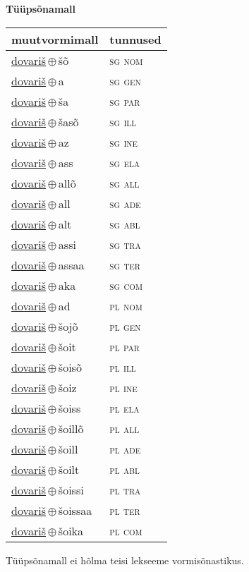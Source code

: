

\vspace{3.5em}
\noindent \begin{minipage}{\textwidth}
\noindent \textbf{Tüüpsõnamall \,}\\

\begin{sideways}
\begin{tabular}{l l}
muutvormimall & tunnused \\
\hline
\underline{dovariš}\,$\oplus$\,šõ & \textsc{ sg nom } \\
\underline{dovariš}\,$\oplus$\,a & \textsc{ sg gen } \\
\underline{dovariš}\,$\oplus$\,ša & \textsc{ sg par } \\
\underline{dovariš}\,$\oplus$\,šasõ & \textsc{ sg ill } \\
\underline{dovariš}\,$\oplus$\,az & \textsc{ sg ine } \\
\underline{dovariš}\,$\oplus$\,ass & \textsc{ sg ela } \\
\underline{dovariš}\,$\oplus$\,allõ & \textsc{ sg all } \\
\underline{dovariš}\,$\oplus$\,all & \textsc{ sg ade } \\
\underline{dovariš}\,$\oplus$\,alt & \textsc{ sg abl } \\
\underline{dovariš}\,$\oplus$\,assi & \textsc{ sg tra } \\
\underline{dovariš}\,$\oplus$\,assaa & \textsc{ sg ter } \\
\underline{dovariš}\,$\oplus$\,aka & \textsc{ sg com } \\
\underline{dovariš}\,$\oplus$\,ad & \textsc{ pl nom } \\
\underline{dovariš}\,$\oplus$\,šojõ & \textsc{ pl gen } \\
\underline{dovariš}\,$\oplus$\,šoit & \textsc{ pl par } \\
\underline{dovariš}\,$\oplus$\,šoisõ & \textsc{ pl ill } \\
\underline{dovariš}\,$\oplus$\,šoiz & \textsc{ pl ine } \\
\underline{dovariš}\,$\oplus$\,šoiss & \textsc{ pl ela } \\
\underline{dovariš}\,$\oplus$\,šoillõ & \textsc{ pl all } \\
\underline{dovariš}\,$\oplus$\,šoill & \textsc{ pl ade } \\
\underline{dovariš}\,$\oplus$\,šoilt & \textsc{ pl abl } \\
\underline{dovariš}\,$\oplus$\,šoissi & \textsc{ pl tra } \\
\underline{dovariš}\,$\oplus$\,šoissaa & \textsc{ pl ter } \\
\underline{dovariš}\,$\oplus$\,šoika & \textsc{ pl com } \\
\end{tabular}
\end{sideways}
\label{tab:tüüpsõnamall-dovariššõ}

\end{minipage}

 
\vspace{1em}
\noindent Tüüpsõnamall  ei hõlma teisi lekseeme vormi\-sõnastikus.
